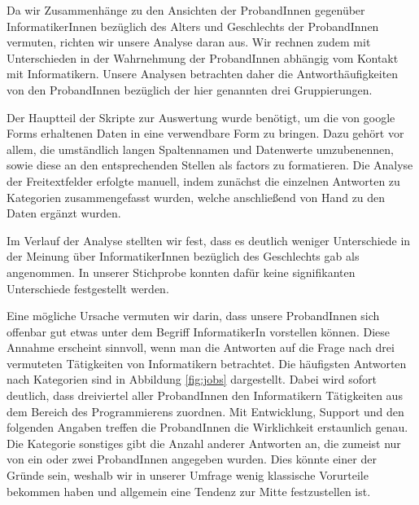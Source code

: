 \documentclass[de]{agse-empir-report}\usepackage[]{graphicx}\usepackage[]{color}
\begin{document}
Da wir Zusammenh\"ange zu den Ansichten der ProbandInnen gegen\"uber InformatikerInnen bez\"uglich des Alters und Geschlechts der ProbandInnen vermuten, richten wir unsere Analyse daran aus. Wir rechnen zudem mit Unterschieden in der Wahrnehmung der ProbandInnen abh\"angig vom Kontakt mit Informatikern. Unsere Analysen betrachten daher die Antworth\"aufigkeiten von den ProbandInnen bez\"uglich der hier genannten drei Gruppierungen.

Der Hauptteil der Skripte zur Auswertung wurde ben\"otigt, um die von google Forms erhaltenen Daten in eine verwendbare Form zu bringen. Dazu geh\"ort vor allem, die umst\"andlich langen Spaltennamen und Datenwerte umzubenennen, sowie diese an den entsprechenden Stellen als factors zu formatieren. Die Analyse der Freitextfelder erfolgte manuell, indem zun\"achst die einzelnen Antworten zu Kategorien zusammengefasst wurden, welche anschlie{\ss}end von Hand zu den Daten erg\"anzt wurden.


Im Verlauf der Analyse stellten wir fest, dass es deutlich weniger Unterschiede in der Meinung \"uber InformatikerInnen bez\"uglich des Geschlechts gab als angenommen. In unserer Stichprobe konnten daf\"ur keine signifikanten Unterschiede festgestellt werden.

Eine m\"ogliche Ursache vermuten wir darin, dass unsere ProbandInnen sich offenbar gut etwas unter dem Begriff InformatikerIn vorstellen k\"onnen. Diese Annahme erscheint sinnvoll, wenn man die Antworten auf die Frage nach drei vermuteten T\"atigkeiten von Informatikern betrachtet. Die h\"aufigsten Antworten nach Kategorien sind in Abbildung \ref{fig:jobs} dargestellt. Dabei wird sofort deutlich, dass dreiviertel aller ProbandInnen den Informatikern T\"atigkeiten aus dem Bereich des Programmierens zuordnen. Mit Entwicklung, Support und den folgenden Angaben treffen die ProbandInnen die Wirklichkeit erstaunlich genau. Die Kategorie sonstiges gibt die Anzahl anderer Antworten an, die zumeist nur von ein oder zwei ProbandInnen angegeben wurden. Dies k\"onnte einer der Gr\"unde sein, weshalb wir in unserer Umfrage wenig klassische Vorurteile bekommen haben und allgemein eine Tendenz zur Mitte festzustellen ist.
\end{document}
